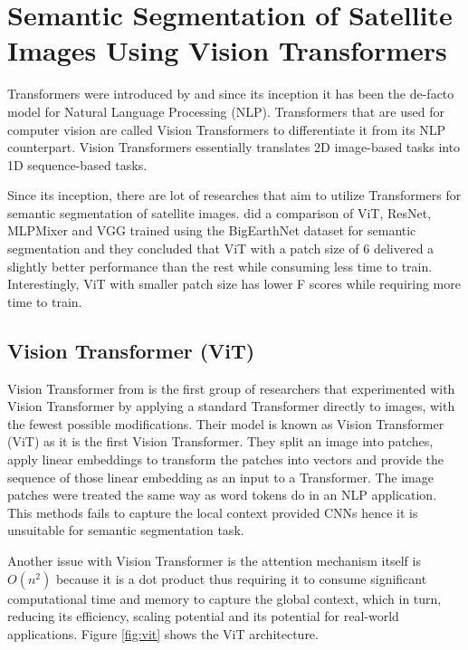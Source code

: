 \section{Semantic Segmentation of Satellite Images Using Vision Transformers}

Transformers were introduced by \cite{attention-is-all-you-need} and since its inception it has been the de-facto model for Natural Language Processing (NLP). Transformers that are used for computer vision are called Vision Transformers to differentiate it from its NLP counterpart. Vision Transformers essentially translates 2D image-based tasks into 1D sequence-based tasks.

Since its inception, there are lot of researches that aim to utilize Transformers for semantic segmentation of satellite images. 
\cite{benchmarking-scaling} did a comparison of ViT, ResNet, MLPMixer and VGG trained using the BigEarthNet dataset for semantic segmentation and they concluded that ViT with a patch size of 6 delivered a slightly better performance than the rest while consuming less time to train. Interestingly, ViT with smaller patch size has lower F scores while requiring more time to train.

\subsection{Vision Transformer (ViT)}
Vision Transformer from \cite{16x16} is the first group of researchers that experimented with Vision Transformer by applying a standard Transformer directly to images, with the fewest possible modifications. Their model is known as Vision Transformer (ViT) as it is the first Vision Transformer. They split an image into patches, apply linear embeddings to transform the patches into vectors and provide the sequence of those linear embedding as an input to a Transformer. The image patches were treated the same way as word tokens do in an NLP application. This methods fails to capture the local context provided  CNNs hence it is unsuitable for semantic segmentation task.

Another issue with Vision Transformer is the attention mechanism itself is $O(n^2)$ because it is a dot product thus requiring it to consume significant computational time and memory to capture the global context, which in turn, reducing its efficiency, scaling potential and its potential for real-world applications. Figure \ref{fig:vit} shows the ViT architecture.

